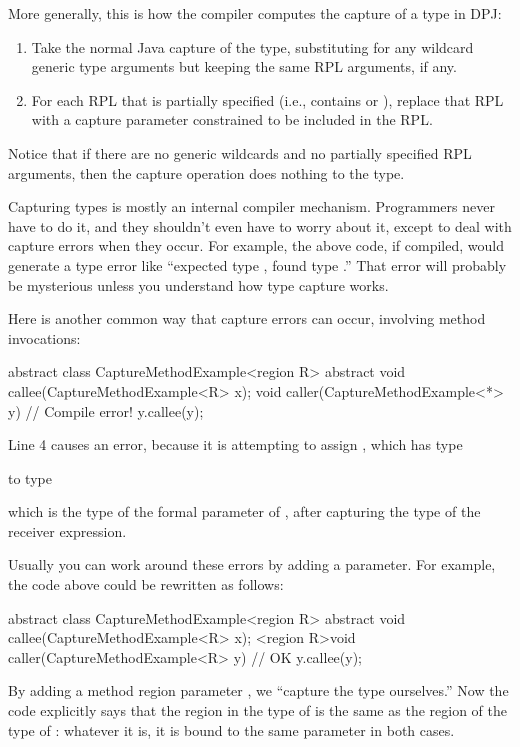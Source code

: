 More generally, this is how the compiler computes the capture of a type
in DPJ:
%
\begin{enumerate}
\item Take the normal Java capture of the type, substituting for any
  wildcard generic type arguments but keeping the same RPL
  arguments, if any.
\item For each RPL that is partially specified (i.e., contains \kwd{*}
  or \kwd{[?]}), replace that RPL with a capture parameter constrained
  to be included in the RPL.
\end{enumerate}
%
Notice that if there are no generic wildcards and no partially
specified RPL arguments, then the capture operation does nothing to
the type.

Capturing types is mostly an internal compiler mechanism.  Programmers
never have to do it, and they shouldn't even have to worry about it,
except to deal with capture errors when they occur.  For example, the
above code, if compiled, would generate a type error like ``expected
type , found type
.''  That error will probably be mysterious
unless you understand how type capture works.

Here is another common way that capture errors can occur, involving
method invocations:
%
\begin{numbereddpjlisting}
abstract class CaptureMethodExample<region R> {
    abstract void callee(CaptureMethodExample<R> x);
    void caller(CaptureMethodExample<*> y) {
        // Compile error!
        y.callee(y);
    }
}
\end{numbereddpjlisting}
%
Line 4 causes an error, because it is attempting to assign ,
which has type 
%
\begin{description}
\item {} 
\end{description}
%
to type 
%
\begin{description}
\item {}
\end{description}
%
which is the type of the formal parameter  of ,
after capturing the type of the receiver expression.

Usually you can work around these errors by adding a parameter.  For
example, the code above could be rewritten as follows:
%
\begin{numbereddpjlisting}
abstract class CaptureMethodExample<region R> {
    abstract void callee(CaptureMethodExample<R> x);
    <region R>void caller(CaptureMethodExample<R> y) {
        // OK
        y.callee(y);
    }
}
\end{numbereddpjlisting}
%
By adding a method region parameter , we ``capture the type
ourselves.''  Now the code explicitly says that the region in the type
of  is the same as the region of the type of : whatever
it is, it is bound to the same parameter  in both cases.



